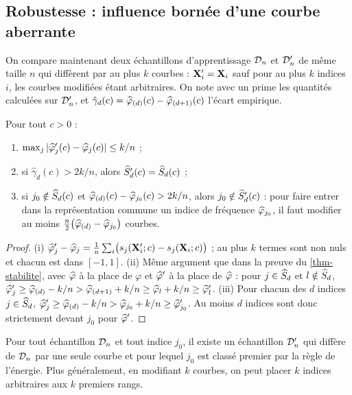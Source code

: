 \subsection{Robustesse : influence bornée d'une courbe aberrante}

On compare maintenant deux échantillons d'apprentissage $\mathcal{D}_n$ et $\mathcal{D}_n'$ de même taille $n$ qui diffèrent par au plus $k$ courbes : $\mathbf{X}'_i=\mathbf{X}_i$ sauf pour au plus $k$ indices $i$, les courbes modifiées étant arbitraires. On note avec un prime les quantités calculées sur $\mathcal{D}_n'$, et $\hat\gamma_d(c)=\widehat{\varphi}_{(d)}(c)-\widehat{\varphi}_{(d+1)}(c)$ l'écart empirique.

\begin{proposition}\label{prop-robustesse}
Pour tout $c>0$ :
\begin{enumerate}[label=(\roman*)]
  \item $\max_j|\widehat{\varphi}'_j(c)-\widehat{\varphi}_j(c)|\le k/n$ ;
  \item si $\hat\gamma_d(c)>2k/n$, alors $\widehat{S}'_d(c)=\widehat{S}_d(c)$ ;
  \item si $j_0\notin\widehat{S}_d(c)$ et $\widehat{\varphi}_{(d)}(c)-\widehat{\varphi}_{j_0}(c)>2k/n$, alors $j_0\notin\widehat{S}'_d(c)$ : pour faire entrer dans la représentation commune un indice de fréquence $\widehat{\varphi}_{j_0}$, il faut modifier au moins $\frac n2\bigl(\widehat{\varphi}_{(d)}-\widehat{\varphi}_{j_0}\bigr)$ courbes.
\end{enumerate}
\end{proposition}

\begin{proof}
(i) $\widehat{\varphi}'_j-\widehat{\varphi}_j=\frac1n\sum_i\bigl(s_j(\mathbf{X}'_i;c)-s_j(\mathbf{X}_i;c)\bigr)$ ; au plus $k$ termes sont non nuls et chacun est dans $[-1,1]$.
(ii) Même argument que dans la preuve du \cref{thm-stabilite}, avec $\widehat{\varphi}$ à la place de $\varphi$ et $\widehat{\varphi}'$ à la place de $\widehat{\varphi}$ : pour $j\in\widehat{S}_d$ et $l\notin\widehat{S}_d$, $\widehat{\varphi}'_j\ge\widehat{\varphi}_{(d)}-k/n>\widehat{\varphi}_{(d+1)}+k/n\ge\widehat{\varphi}_l+k/n\ge\widehat{\varphi}'_l$.
(iii) Pour chacun des $d$ indices $j\in\widehat{S}_d$, $\widehat{\varphi}'_j\ge\widehat{\varphi}_{(d)}-k/n>\widehat{\varphi}_{j_0}+k/n\ge\widehat{\varphi}'_{j_0}$. Au moins $d$ indices sont donc strictement devant $j_0$ pour $\widehat{\varphi}'$.
\end{proof}

\begin{proposition}\label{prop-rupture-energie}
Pour tout échantillon $\mathcal{D}_n$ et tout indice $j_0$, il existe un échantillon $\mathcal{D}_n'$ qui diffère de $\mathcal{D}_n$ par une seule courbe et pour lequel $j_0$ est classé premier par la règle de l'énergie. Plus généralement, en modifiant $k$ courbes, on peut placer $k$ indices arbitraires aux $k$ premiers rangs.
\end{proposition}

